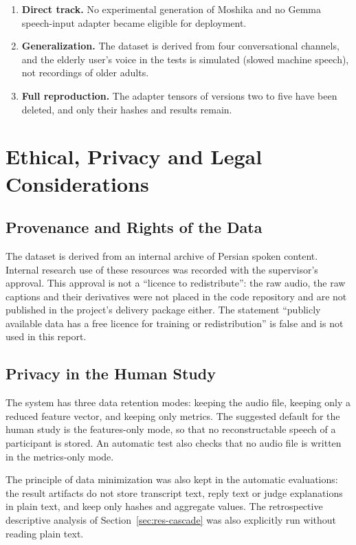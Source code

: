 \begin{enumerate}
\item \textbf{Direct track.} No experimental generation of Moshika and no Gemma speech-input adapter
      became eligible for deployment.

\item \textbf{Generalization.} The dataset is derived from four conversational channels, and the
      elderly user's voice in the tests is simulated (slowed machine speech), not recordings of older
      adults.

\item \textbf{Full reproduction.} The adapter tensors of versions two to five have been deleted, and
      only their hashes and results remain.
\end{enumerate}

\section{Ethical, Privacy and Legal Considerations}
\label{sec:ethics}

\subsection{Provenance and Rights of the Data}

The dataset is derived from an internal archive of Persian spoken content. Internal research use
of these resources was recorded with the supervisor's approval. This approval is not a ``licence to
redistribute'': the raw audio, the raw captions and their derivatives were not placed in the code
repository and are not published in the project's delivery package either. The statement ``publicly
available data has a free licence for training or redistribution'' is false and is not used in this
report.

\subsection{Privacy in the Human Study}

The system has three data retention modes: keeping the audio file, keeping only a reduced feature
vector, and keeping only metrics. The suggested default for the human study is the features-only
mode, so that no reconstructable speech of a participant is stored. An automatic test also checks
that no audio file is written in the metrics-only mode.

The principle of data minimization was also kept in the automatic evaluations: the result artifacts
do not store transcript text, reply text or judge explanations in plain text, and keep only hashes
and aggregate values. The retrospective descriptive analysis of Section~\ref{sec:res-cascade} was
also explicitly run without reading plain text.

